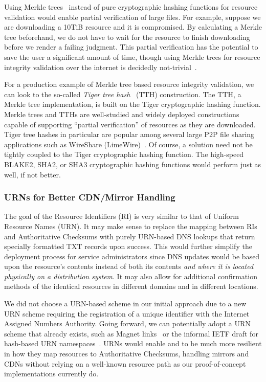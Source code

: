 Using Merkle trees~\cite{Merkle} instead of pure cryptographic hashing functions
for resource validation would enable partial verification of large files. For
example, suppose we are downloading a 10TiB resource and it is compromised. By
calculating a Merkle tree beforehand, we do not have to wait for the resource to
finish downloading before we render a failing judgment. This partial
verification has the potential to save the user a significant amount of time,
though using Merkle trees for resource integrity validation over the internet is
decidedly not-trivial~\cite{Merkle-HTTP}.

For a production example of Merkle tree based resource integrity validation, we
can look to the so-called \emph{Tiger tree hash}~\cite{TTH, Merkle} (TTH)
construction. The TTH, a Merkle tree implementation, is built on the Tiger
cryptographic hashing function. Merkle trees and TTHs are well-studied and
widely deployed constructions capable of supporting ``partial verification'' of
resources as they are downloaded. Tiger tree hashes in particular are popular
among several large P2P file sharing applications such as WireShare
(LimeWire)~\cite{LimeWire}. Of course, a solution need not be tightly coupled to
the Tiger cryptographic hashing function. The high-speed BLAKE2, SHA2, or SHA3
cryptographic hashing functions would perform just as well, if not better.

\subsubsection{URNs for Better CDN/Mirror Handling}

The goal of the Resource Identifiers (RI) is very similar to that of Uniform
Resource Names (URN). It may make sense to replace the mapping between RIs and
Authoritative Checksums with purely URN-based DNS lookups that return specially
formatted TXT records upon success. This would further simplify the deployment
process for service administrators since DNS updates would be based upon the
resource's contents instead of both its contents \textit{and where it is located
physically on a distribution system}. It may also allow for additional
confirmation methods of the identical resources in different domains and in
different locations.

We did not choose a URN-based scheme in our initial approach due to a new URN
scheme requiring the registration of a unique identifier with the Internet
Assigned Numbers Authority. Going forward, we can potentially adopt a URN scheme
that already exists, such as Magnet links~\cite{MagnetLinks} or the informal
IETF draft for hash-based URN namespaces~\cite{draft-URN}. URNs would enable
\DNSSYS{} and \DHTSYS{} to be much more resilient in how they map resources to
Authoritative Checksums, handling mirrors and CDNs without relying on a
well-known resource path as our proof-of-concept implementations currently do.
